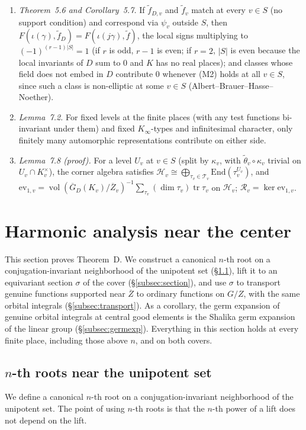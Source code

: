 \documentclass[12pt]{article}
\newcommand{\ov}[1]{\overline{#1}}
\newcommand{\tr}{\operatorname{tr}}
\newcommand{\vol}{\operatorname{vol}}
\newcommand{\Zb}{\ov{Z}}
\newcommand{\GDb}{\ov{G}_D}
\newcommand{\sg}{\sigma}
\theoremstyle{plain}
\theoremstyle{definition}
\begin{document}
\begin{enumerate}[label=(I\arabic*)]
\item \emph{Theorem~5.6 and Corollary~5.7.} If $\tilde f_{D,v}$ and $\tilde f_v$ match at every $v\in S$ (no support condition) and correspond via $\psi_v$ outside $S$, then $F(\iota(\gamma),\tilde f_D)=F(\iota(j\gamma),\tilde f)$, the local signs multiplying to $(-1)^{(r-1)|S|}=1$ (if $r$ is odd, $r-1$ is even; if $r=2$, $|S|$ is even because the local invariants of $D$ sum to $0$ and $K$ has no real places); and classes whose field does not embed in $D$ contribute $0$ whenever (M2) holds at all $v\in S$, since such a class is non-elliptic at some $v\in S$ (Albert--Brauer--Hasse--Noether).
\item \emph{Lemma~7.2.} For fixed levels at the finite places (with any test functions bi-invariant under them) and fixed $K_\infty$-types and infinitesimal character, only finitely many automorphic representations contribute on either side.
\item \emph{Lemma~7.8 (proof).} For a level $U_v$ at $v\in S$ (split by $\kappa_v$, with $\tilde\theta_v\circ\kappa_v$ trivial on $U_v\cap K_v^\times$), the corner algebra satisfies $\mathcal H_v\cong\bigoplus_{\tau_v\in\mathcal T_v}\mathrm{End}(\tau_v^{U_v})$, and $\mathrm{ev}_{1,v}=\vol(\GDb(K_v)/\Zb_v)^{-1}\sum_{\tau_v}(\dim\tau_v)\tr\tau_v$ on $\mathcal H_v$; $\mathcal R_v=\ker\mathrm{ev}_{1,v}$.
\end{enumerate}

\section{Harmonic analysis near the center}\label{sec:center}
This section proves Theorem~D. We construct a canonical $n$-th root on a conjugation-invariant neighborhood of the unipotent set (\S\ref{subsec:roots}), lift it to an equivariant section $\sg$ of the cover (\S\ref{subsec:section}), and use $\sg$ to transport genuine functions supported near $\Zb$ to ordinary functions on $G/Z$, with the same orbital integrals (\S\ref{subsec:transport}). As a corollary, the germ expansion of genuine orbital integrals at central good elements is the Shalika germ expansion of the linear group (\S\ref{subsec:germexp}). Everything in this section holds at every finite place, including those above $n$, and on both covers.

\subsection{$n$-th roots near the unipotent set}\label{subsec:roots}
We define a canonical $n$-th root on a conjugation-invariant neighborhood of the unipotent set. The point of using $n$-th roots is that the $n$-th power of a lift does not depend on the lift.
\end{document}
